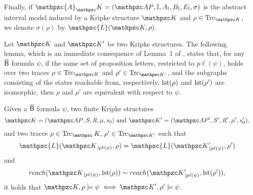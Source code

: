 Finally, if  $\mathpzc{A}_\Ku=(\Prop,\mathbb{I},A_\mathbb{I},B_\mathbb{I},E_\mathbb{I},\sigma)$ is the abstract interval model induced by a Kripke structure  $\Ku$ and $\rho\in\Trk_{\Ku}$,
 we denote $\sigma(\rho)$ by $\mathpzc{L}(\Ku,\rho)$.

Let $\Ku$ and $\Ku'$ be two Kripke structures. The following lemma, which is an immediate consequence of Lemma~1 of \cite{MMP15B}, states that, for any $\mathsf{\overline{B}}$ formula $\psi$, if the same set of proposition letters, restricted to $p\ell(\psi)$, holds over two traces $\rho \in \Trk_{\Ku}$ and $\rho' \in \Trk_{\Ku'}$, and the subgraphs consisting of the states reachable from, respectively, $\operatorname{lst}(\rho)$ and $\operatorname{lst}(\rho')$ are isomorphic, then $\rho$ and $\rho'$ are equivalent with respect to $\psi$.

\begin{lemma}\label{lemmaBbar}
Given a $\mathsf{\overline{B}}$ formula $\psi$, two finite Kripke structures \[\Ku=\KuDef \text{ and } \Ku'=(\Prop',\States', \Edges',\Lab',\sinit'),\] and two traces $\rho\in\Trk_\Ku,\, \rho'\in \Trk_{\Ku'}$ such that  \[\mathpzc{L}(\Ku_{\,|p\ell(\psi)},\rho)=\mathpzc{L}(\Ku'_{\,|p\ell(\psi)},\rho')\] and 
\[reach(\Ku_{\,|p\ell(\psi)},\lst(\rho))\sim reach(\Ku'_{\,|p\ell(\psi)},\lst(\rho')),\]
it holds that $\Ku,\rho\models\psi\iff \Ku',\rho'\models\psi$.
\end{lemma}

